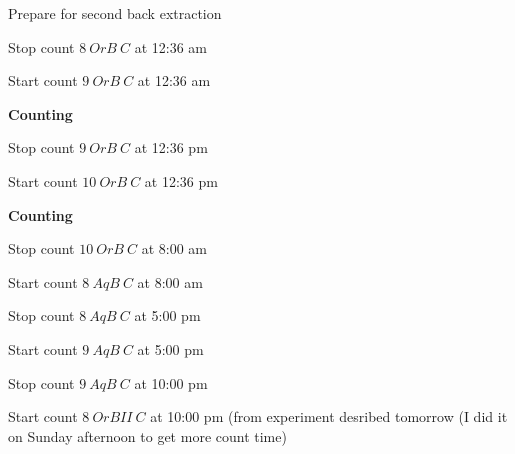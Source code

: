 \documentclass[idxtotoc,hyperref,openany,oneside]{labbook} %
\newcommand{\cmark}{\ding{51}}%
\newcommand{\done}{\rlap{$\square$}{\raisebox{2pt}{\large\hspace{1pt}\cmark}}%
  \hspace{-2.5pt}}
\begin{document}
\begin{todolist}
\item[\done]{Prepare for second back extraction}
\item[\done]{Stop count $\boxed{8\ OrB\ C}$ at 12:36 am}
\item[\done]{Start count $\boxed{9\ OrB\ C}$ at 12:36 am} 
\end{todolist}




\textbf{Counting}
\begin{todolist}
\item[\done]{Stop count $\boxed{9\ OrB\ C}$ at 12:36 pm}
\item[\done]{Start count $\boxed{10\ OrB\ C}$ at 12:36 pm}
\end{todolist}





\textbf{Counting}
\begin{todolist}
\item[\done]{Stop count $\boxed{10\ OrB\ C}$ at 8:00 am}
\item[\done]{Start count $\boxed{8\ AqB\ C}$ at 8:00 am}
\item[\done]{Stop count $\boxed{8\ AqB\ C}$ at 5:00 pm}
\item[\done]{Start count $\boxed{9\ AqB\ C}$ at 5:00 pm}
\item[\done]{Stop count $\boxed{9\ AqB\ C}$ at 10:00 pm}
\item[\done]{Start count $\boxed{8\ OrBII\ C}$ at 10:00 pm (from experiment
  desribed tomorrow (I did it on Sunday afternoon to get more
count time)}
\end{todolist}



\end{document}
